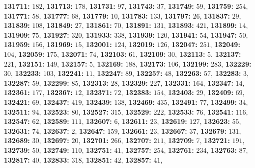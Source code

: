 \textsf{\bfseries 131711:} $182$, \textsf{\bfseries 131713:} $178$, \textsf{\bfseries 131731:} $97$, \textsf{\bfseries 131743:} $37$, \textsf{\bfseries 131749:} $59$, \textsf{\bfseries 131759:} $254$, \textsf{\bfseries 131771:} $58$, \textsf{\bfseries 131777:} $68$, \textsf{\bfseries 131779:} $10$, \textsf{\bfseries 131783:} $133$, \textsf{\bfseries 131797:} $26$, \textsf{\bfseries 131837:} $29$, \textsf{\bfseries 131839:} $108$, \textsf{\bfseries 131849:} $27$, \textsf{\bfseries 131861:} $70$, \textsf{\bfseries 131891:} $131$, \textsf{\bfseries 131893:} $421$, \textsf{\bfseries 131899:} $14$, \textsf{\bfseries 131909:} $75$, \textsf{\bfseries 131927:} $320$, \textsf{\bfseries 131933:} $338$, \textsf{\bfseries 131939:} $120$, \textsf{\bfseries 131941:} $54$, \textsf{\bfseries 131947:} $50$, \textsf{\bfseries 131959:} $156$, \textsf{\bfseries 131969:} $15$, \textsf{\bfseries 132001:} $124$, \textsf{\bfseries 132019:} $126$, \textsf{\bfseries 132047:} $251$, \textsf{\bfseries 132049:} $104$, \textsf{\bfseries 132059:} $175$, \textsf{\bfseries 132071:} $74$, \textsf{\bfseries 132103:} $61$, \textsf{\bfseries 132109:} $30$, \textsf{\bfseries 132113:} $5$, \textsf{\bfseries 132137:} $221$, \textsf{\bfseries 132151:} $149$, \textsf{\bfseries 132157:} $5$, \textsf{\bfseries 132169:} $188$, \textsf{\bfseries 132173:} $106$, \textsf{\bfseries 132199:} $283$, \textsf{\bfseries 132229:} $30$, \textsf{\bfseries 132233:} $103$, \textsf{\bfseries 132241:} $11$, \textsf{\bfseries 132247:} $89$, \textsf{\bfseries 132257:} $48$, \textsf{\bfseries 132263:} $57$, \textsf{\bfseries 132283:} $3$, \textsf{\bfseries 132287:} $59$, \textsf{\bfseries 132299:} $85$, \textsf{\bfseries 132313:} $28$, \textsf{\bfseries 132329:} $227$, \textsf{\bfseries 132331:} $164$, \textsf{\bfseries 132347:} $14$, \textsf{\bfseries 132361:} $177$, \textsf{\bfseries 132367:} $12$, \textsf{\bfseries 132371:} $72$, \textsf{\bfseries 132383:} $154$, \textsf{\bfseries 132403:} $29$, \textsf{\bfseries 132409:} $69$, \textsf{\bfseries 132421:} $69$, \textsf{\bfseries 132437:} $419$, \textsf{\bfseries 132439:} $138$, \textsf{\bfseries 132469:} $435$, \textsf{\bfseries 132491:} $77$, \textsf{\bfseries 132499:} $34$, \textsf{\bfseries 132511:} $94$, \textsf{\bfseries 132523:} $80$, \textsf{\bfseries 132527:} $315$, \textsf{\bfseries 132529:} $222$, \textsf{\bfseries 132533:} $76$, \textsf{\bfseries 132541:} $116$, \textsf{\bfseries 132547:} $62$, \textsf{\bfseries 132589:} $111$, \textsf{\bfseries 132607:} $6$, \textsf{\bfseries 132611:} $23$, \textsf{\bfseries 132619:} $127$, \textsf{\bfseries 132623:} $55$, \textsf{\bfseries 132631:} $74$, \textsf{\bfseries 132637:} $2$, \textsf{\bfseries 132647:} $159$, \textsf{\bfseries 132661:} $23$, \textsf{\bfseries 132667:} $37$, \textsf{\bfseries 132679:} $131$, \textsf{\bfseries 132689:} $30$, \textsf{\bfseries 132697:} $20$, \textsf{\bfseries 132701:} $266$, \textsf{\bfseries 132707:} $211$, \textsf{\bfseries 132709:} $7$, \textsf{\bfseries 132721:} $191$, \textsf{\bfseries 132739:} $50$, \textsf{\bfseries 132749:} $110$, \textsf{\bfseries 132751:} $41$, \textsf{\bfseries 132757:} $254$, \textsf{\bfseries 132761:} $234$, \textsf{\bfseries 132763:} $87$, \textsf{\bfseries 132817:} $40$, \textsf{\bfseries 132833:} $318$, \textsf{\bfseries 132851:} $42$, \textsf{\bfseries 132857:} $41$, 
